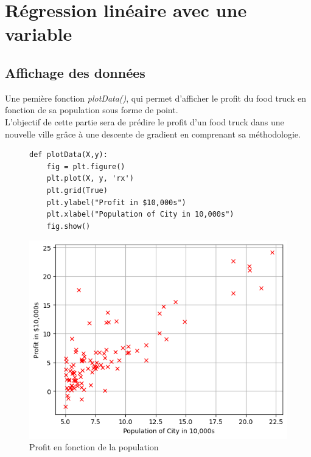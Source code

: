 \section{Régression linéaire avec une variable}
\subsection{Affichage des données}

Une pemière fonction \textit{plotData()}, qui permet d'afficher le profit du food truck en fonction de sa population sous forme de point. \\
L'objectif de cette partie sera de prédire le profit d'un food truck dans une nouvelle ville grâce à une descente de gradient en comprenant sa méthodologie.

\begin{figure}[!h]
    \begin{minipage}{.48\linewidth}
\begin{verbatim}
def plotData(X,y):
    fig = plt.figure()
    plt.plot(X, y, 'rx')
    plt.grid(True)
    plt.ylabel("Profit in $10,000s")
    plt.xlabel("Population of City in 10,000s")
    fig.show()
\end{verbatim}   
    \end{minipage}\hfill
    \begin{minipage}{.48\linewidth}
        \begin{center}
            \includegraphics[width=1\textwidth]{./img/4-1.png}
            \caption{\label{fig:fig1}Profit en fonction de la population}  
        \end{center}
    \end{minipage}
\end{figure}

